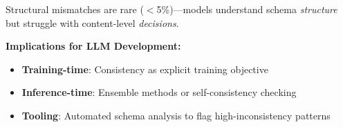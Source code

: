 \documentclass[sigconf,anonymous,review]{acmart}
\begin{document}
Structural mismatches are rare ($<$5\%)---models understand schema \textit{structure} but struggle with content-level \textit{decisions}.

\textbf{Implications for LLM Development:}
\begin{itemize}
    \item \textbf{Training-time}: Consistency as explicit training objective
    \item \textbf{Inference-time}: Ensemble methods or self-consistency checking
    \item \textbf{Tooling}: Automated schema analysis to flag high-inconsistency patterns
\end{itemize}
\end{document}
